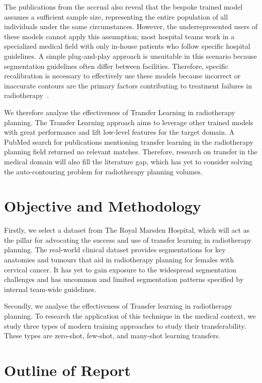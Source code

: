 \documentclass[12pt,twoside]{report}
\begin{document}
The publications from the accrual also reveal that the bespoke trained model assumes a sufficient sample size, representing the entire population of all individuals under the same circumstances. However, the underrepresented users of these models cannot apply this assumption; most hospital teams work in a specialized medical field with only in-house patients who follow specific hospital guidelines. A simple plug-and-play approach is unsuitable in this scenario because segmentation guidelines often differ between facilities. Therefore, specific recalibration is necessary to effectively use these models because incorrect or inaccurate contours are the primary factors contributing to treatment failures in radiotherapy~\cite{Rhee2020-ms}.

We therefore analyse the effectiveness of Transfer Learning in radiotherapy planning. The Transfer Learning approach aims to leverage other trained models with great performance and lift low-level features for the target domain. A PubMed search for publications mentioning transfer learning in the radiotherapy planning field returned no relevant matches. Therefore, research on transfer in the medical domain will also fill the literature gap, which has yet to consider solving the auto-contouring problem for radiotherapy planning volumes. 

\section{Objective and Methodology}

Firstly, we select a dataset from The Royal Marsden Hospital, which will act as the pillar for advocating the success and use of transfer learning in radiotherapy planning. The real-world clinical dataset provides segmentations for key anatomies and tumours that aid in radiotherapy planning for females with cervical cancer. It has yet to gain exposure to the widespread segmentation challenges and has uncommon and limited segmentation patterns specified by internal team-wide guidelines.

Secondly, we analyse the effectiveness of Transfer learning in radiotherapy planning. To research the application of this technique in the medical context, we study three types of modern training approaches to study their transferability. These types are zero-shot, few-shot, and many-shot learning transfers.

\section{Outline of Report}
\end{document}
